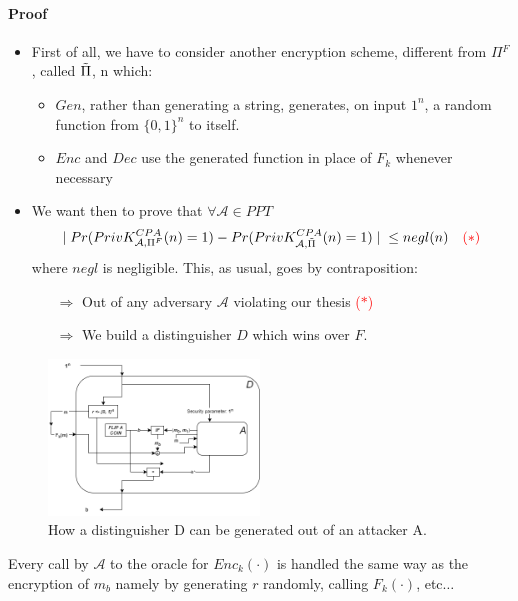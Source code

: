 \documentclass[../main]{subfiles}
\begin{document}
\paragraph{Proof}
\begin{itemize}
    \item First of all, we have to consider another encryption scheme, different from $\Pi{}^F$, called $\Tilde{\Pi{}}$, n which:
    \begin{itemize}
        \item $Gen$, rather than generating a string, generates, on input $1^n$, a random function from $\{0, 1\}^n$ to itself.
        \item $Enc$ and $Dec$ use the generated function in place of $F_k$ whenever necessary
    \end{itemize}
    \item We want then to prove that $\forall{} \mathcal{A} \in{} PPT$ $$\mid{} Pr(PrivK^{CPA}_{\mathcal{A}, \Pi{}^F}(n)=1)-Pr(PrivK^{CPA}_{\mathcal{A}, \Tilde{\Pi{}}}(n)=1) \mid{} \leq{} negl(n) \quad{} \textcolor{red}{(*)}$$ where $negl$ is negligible.
    This, as usual, goes by contraposition:
    \begin{itemize}
        \item[$\Rightarrow{}$] Out of any adversary $\mathcal{A}$ violating our thesis \textcolor{red}{($*$)}
        \item[$\Rightarrow{}$] We build a distinguisher $D$ which wins over $F$.
    \end{itemize}
\end{itemize}
\begin{figure}[H]
    \centering
    \includegraphics[width=0.5\textwidth]{images/security_fp_induced_scheme}
    \caption{How a distinguisher D can be generated out of an attacker A.}
\end{figure}
\noindent
Every call by $\mathcal{A}$ to the oracle for $Enc_k(\cdot{})$ is handled the same way as the encryption of $m_b$ namely by generating $r$ randomly, calling $F_k(\cdot{})$, etc$\ldots{}$
\end{document}
